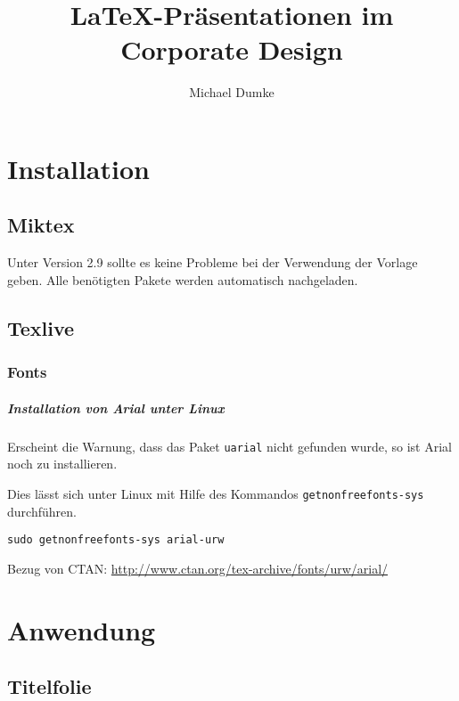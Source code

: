 \documentclass[a4paper,colorscheme=green,TUBStitlepage=picture]{tubsreprt}
\author{Michael Dumke}
\title{LaTeX-Präsentationen im Corporate Design}
\institute{TU-Braunschweig}
\begin{document}
\maketitle

\tableofcontents
% 


\chapter{Installation}

\section{Miktex}

Unter Version 2.9 sollte es keine Probleme bei der Verwendung der Vorlage geben.
Alle benötigten Pakete werden automatisch nachgeladen.

\section{Texlive}

\subsection{Fonts}

\paragraph{Installation von Arial unter Linux}

Erscheint die Warnung, dass das Paket \lstinline{uarial} nicht gefunden wurde,
so ist Arial noch zu installieren.

Dies lässt sich unter Linux mit Hilfe des Kommandos
\lstinline{getnonfreefonts-sys} durchführen.

\begin{lstlisting}
sudo getnonfreefonts-sys arial-urw
\end{lstlisting}

Bezug von CTAN: \url{http://www.ctan.org/tex-archive/fonts/urw/arial/}

\chapter{Anwendung}

\section{Titelfolie}
\end{document}
